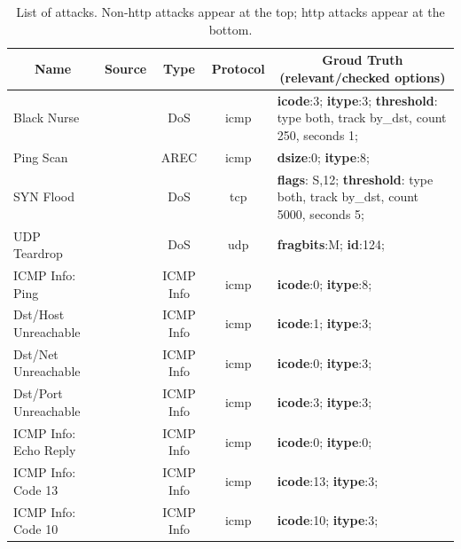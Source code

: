 \documentclass[conference]{IEEEtran}
\begin{document}
\begin{table}[t!]
  \footnotesize
  \caption{\label{table:attacks}List of attacks. Non-http attacks
    appear at the top; http attacks appear at the bottom.}
  \vspace{-2ex}
  \centering
  \setlength{\tabcolsep}{4.5pt}
  \renewcommand{\arraystretch}{0.4}
  \begin{tabular}{lcccp{10.9cm}}
    \toprule
    \multicolumn{1}{c}{Name} &
    \multicolumn{1}{c}{Source} &
    \multicolumn{1}{c}{Type} &
    \multicolumn{1}{c}{Protocol} &
    \multicolumn{1}{c}{Groud Truth (relevant/checked options)} \\
    \midrule
    Black Nurse & \cite{pcap-attacks} & DoS & icmp & \textbf{icode}:3; \textbf{itype}:3; \textbf{threshold}: type both, track by\_dst, count 250, seconds 1;\\    
    Ping Scan & \cite{netmap} & AREC & icmp & \textbf{dsize}:0; \textbf{itype}:8; \\
    SYN Flood & \cite{hping3} & DoS & tcp & \textbf{flags}: S,12;
    \textbf{threshold}: type both, track by\_dst, count 5000, seconds 5;\\
    UDP Teardrop & \cite{udp-teardrop-source} & DoS & udp & \textbf{fragbits}:M; \textbf{id}:124; \\
      ICMP Info: Ping & \cite{iscx} & ICMP Info & icmp & \textbf{icode}:0; \textbf{itype}:8; \\
      Dst/Host Unreachable & \cite{iscx} & ICMP Info & icmp & \textbf{icode}:1; \textbf{itype}:3; \\
      Dst/Net Unreachable & \cite{iscx} & ICMP Info & icmp & \textbf{icode}:0; \textbf{itype}:3; \\
      Dst/Port Unreachable & \cite{iscx} & ICMP Info & icmp & \textbf{icode}:3; \textbf{itype}:3; \\
      ICMP Info: Echo Reply & \cite{iscx} & ICMP Info & icmp & \textbf{icode}:0; \textbf{itype}:0; \\
      ICMP Info: Code 13 & \cite{iscx} & ICMP Info & icmp & \textbf{icode}:13; \textbf{itype}:3; \\
      ICMP Info: Code 10 & \cite{iscx} & ICMP Info & icmp & \textbf{icode}:10; \textbf{itype}:3; \\
    \midrule

\end{tabular}
\end{table}
\end{document}
